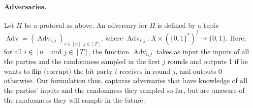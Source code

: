 \documentclass[10pt,a4paper]{article}
\begin{document}
\paragraph{Adversaries.} Let $\Pi$ be a protocol as above. An adversary for $\Pi$ is defined by a tuple $\operatorname{Adv}=(\operatorname{Adv}_{i,j})_{i\in[n],j\in[T]}$, where $\operatorname{Adv}_{i,j}:X\times(\{0,1\}^*)^j\to\{0,1\}$. Here, for all $i\in[n]$ and $j\in[T]$, the function $\operatorname{Adv}_{i,j}$ takes as input the inputs of all the parties and the randomness sampled in the first $j$ rounds and outputs 1 if he wants to flip (corrupt) the bit party $i$ receives in round $j$, and outputs 0 otherwise. Our formulation thus, captures adversaries that have knowledge of all the parties' inputs and the randomness they sampled so far, but are unaware of the randomness they will sample in the future.
\end{document}
